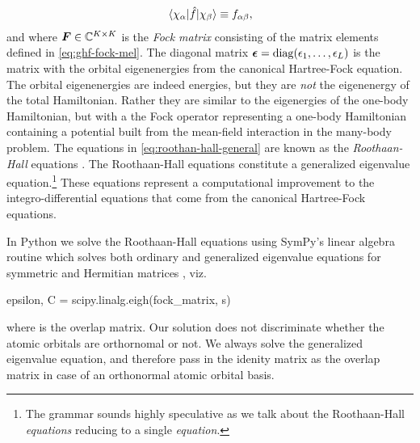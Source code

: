             \begin{align}
                \mel*{\chi_{\alpha}}{\hat{f}}{\chi_{\beta}}
                \equiv f_{\alpha \beta},
                \label{eq:ghf-fock-mel}
            \end{align}
            and where $\boldsymbol{F} \in \mathbb{C}^{K \times K}$ is the \emph{Fock
            matrix} consisting of the matrix elements defined in
            \autoref{eq:ghf-fock-mel}.
            The diagonal matrix $\boldsymbol{\epsilon} = \operatorname{diag}(\epsilon_1, \dots,
            \epsilon_L)$ is the matrix with the orbital eigenenergies from the
            canonical Hartree-Fock equation.
            The orbital eigenenergies are indeed energies, but they are
            \emph{not} the eigenenergy of the total Hamiltonian.
            Rather they are similar to the eigenergies of the one-body
            Hamiltonian, but with a the Fock operator representing a one-body
            Hamiltonian containing a potential built from the mean-field
            interaction in the many-body problem.
            The equations in \autoref{eq:roothan-hall-general} are known as the
            \emph{Roothaan-Hall} equations \cite{roothan, hall}.
            The Roothaan-Hall equations constitute a generalized eigenvalue
            equation.\footnote{%
                The grammar sounds highly speculative as we talk about the
                Roothaan-Hall \emph{equations} reducing to a single
                \emph{equation}.
            }
            These equations represent a computational improvement to the
            integro-differential equations that come from the canonical
            Hartree-Fock equations.

            In Python we solve the Roothaan-Hall equations using SymPy's linear
            algebra routine  which solves both ordinary
            and generalized eigenvalue equations for symmetric and Hermitian
            matrices \cite{sympy}, viz.
            \begin{python}
epsilon, C = scipy.linalg.eigh(fock_matrix, s)
            \end{python}
            where  is the overlap matrix.
            Our solution does not discriminate whether the atomic orbitals are
            orthornomal or not.
            We always solve the generalized eigenvalue equation, and therefore
            pass in the idenity matrix as the overlap matrix in case of an
            orthonormal atomic orbital basis.

